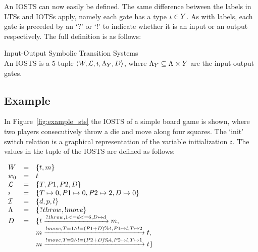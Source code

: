 \vspace{10px}
An IOSTS can now easily be defined. The same difference between the labels in LTSs and IOTSs apply, namely each gate has a type $\iota \in Y$. As with labels, each gate is preceded by an `?' or `!' to indicate whether it is an input or an output respectively. The full definition is as follows:
\vspace{10px}
\begin{definition} Input-Output Symbolic Transition Systems \\
An IOSTS is a 5-tuple $\langle W, \mathcal{L}, \imath, \Lambda_{Y}, D\rangle$, where $\Lambda_{Y}\subseteq \Lambda \times Y$ are the input-output gates.
\end{definition}

\subsection{Example}\label{sec:sts_example}
In Figure~\ref{fig:example_sts} the IOSTS of a simple board game is shown, where two players consecutively throw a die and move along four squares. The `init' switch relation is a graphical representation of the variable initialization $\imath$. The values in the tuple of the IOSTS are defined as follows:

$\begin{array}{lcl}
W & = & \{t, m\} \\
w_0 & = & t \\
\mathcal{L} & = & \{T, P1, P2, D\} \\
\imath & = & \{T \mapsto 0, P1 \mapsto 0, P2 \mapsto 2, D \mapsto 0\} \\
\mathcal{I} & = & \{d, p, l\} \\
\Lambda & = & \{?throw, !move\} \\
D & = & \{t\xrightarrow{?throw, 1 <= d <= 6, D \mapsto d}m, \\
 & & m\xrightarrow{!move, T=1 \land l=(P1+D)\%4, P1 \mapsto l, T \mapsto 2}t, \\
 & & m\xrightarrow{!move, T=2 \land l=(P2+D)\%4, P2 \mapsto l, T \mapsto 1}t\}
\end{array}$

